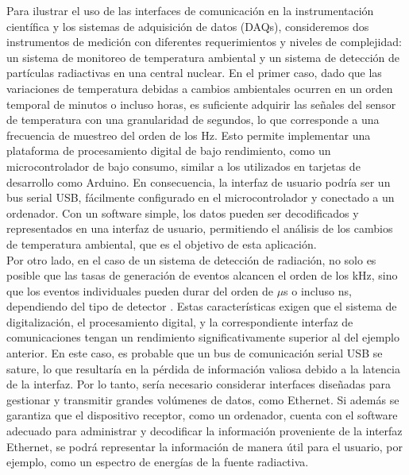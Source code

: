 \documentclass{report}
\begin{document}
\noindent Para ilustrar el uso de las interfaces de comunicación en la instrumentación científica y los sistemas de adquisición de datos (DAQs), consideremos dos instrumentos de medición con diferentes requerimientos y niveles de complejidad: un sistema de monitoreo de temperatura ambiental y un sistema de detección de partículas radiactivas en una central nuclear. En el primer caso, dado que las variaciones de temperatura debidas a cambios ambientales ocurren en un orden temporal de minutos o incluso horas, es suficiente adquirir las señales del sensor de temperatura con una granularidad de segundos, lo que corresponde a una frecuencia de muestreo del orden de los Hz. Esto permite implementar una plataforma de procesamiento digital de bajo rendimiento, como un microcontrolador de bajo consumo, similar a los utilizados en tarjetas de desarrollo como Arduino. En consecuencia, la interfaz de usuario podría ser un bus serial USB, fácilmente configurado en el microcontrolador y conectado a un ordenador. Con un software simple, los datos pueden ser decodificados y representados en una interfaz de usuario, permitiendo el análisis de los cambios de temperatura ambiental, que es el objetivo de esta aplicación. \\

\noindent Por otro lado, en el caso de un sistema de detección de radiación, no solo es posible que las tasas de generación de eventos alcancen el orden de los kHz, sino que los eventos individuales pueden durar del orden de $\mu$s o incluso ns, dependiendo del tipo de detector \cite{knoll9}. Estas características exigen que el sistema de digitalización, el procesamiento digital, y la correspondiente interfaz de comunicaciones tengan un rendimiento significativamente superior al del ejemplo anterior. En este caso, es probable que un bus de comunicación serial USB se sature, lo que resultaría en la pérdida de información valiosa debido a la latencia de la interfaz. Por lo tanto, sería necesario considerar interfaces diseñadas para gestionar y transmitir grandes volúmenes de datos, como Ethernet. Si además se garantiza que el dispositivo receptor, como un ordenador, cuenta con el software adecuado para administrar y decodificar la información proveniente de la interfaz Ethernet, se podrá representar la información de manera útil para el usuario, por ejemplo, como un espectro de energías de la fuente radiactiva.


 
\end{document}
